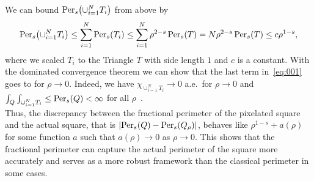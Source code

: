 \begin{example}
	We can bound \( \Per{s}{\cup_{i = 1}^N T_i}{} \) from above by
	\begin{align*}
		\Per{s}{\cup_{i = 1}^N T_i}{} \leq \sum_{i = 1}^N \Per{s}{T_i}{} \leq \sum_{i = 1}^N \rho^{2-s} \Per{s}{T}{} = N \rho^{2-s} \Per{s}{T}{} \leq c \rho^{1-s},
	\end{align*}
	where we scaled \( T_i \) to the Triangle \( T \) with side length \( 1 \) and \( c \) is a
	constant. With the dominated convergence theorem we can show that the last term in~\eqref{eq:001} goes
	to for \( \rho \to 0 \). Indeed, we have \( \chi_{\cup_{i = 1}^N T_i {}} \to 0 \) a.e.\ for \(
	\rho \to 0 \) and \( \int_Q \int_{\cup_{i = 1}^N T_i} \leq \Per{s}{Q}{} < \infty \) for all \( \rho \)~\cite{onoue2022}. \\
	Thus, the discrepancy between the fractional perimeter of the pixelated square and the actual
	square, that is \( \lvert \Per{s}{Q}{} - \Per{s}{Q_\rho}{} \rvert \), behaves like \(
	\rho^{1-s} + a(\rho) \) for some function \( a \) such that \( a(\rho) \to 0 \) as \( \rho \to 0
	\). This shows that the fractional perimeter can capture the actual perimeter of the square more
	accurately and serves as a more robust framework than the classical perimeter in some cases.
\end{example}


